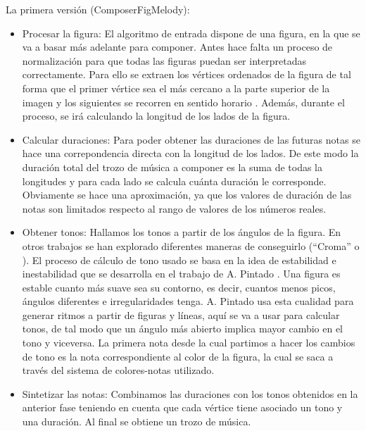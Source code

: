 La primera versión (ComposerFigMelody):
\begin{itemize}
	\item Procesar la figura: El algoritmo de entrada dispone de una figura, en la que se va a basar más adelante para componer. Antes hace falta un proceso de normalización para que todas las figuras puedan ser interpretadas correctamente. \color{blue} Para ello se extraen los vértices ordenados de la figura de tal forma que el primer vértice sea el más cercano a la parte superior de la imagen y los siguientes se recorren en sentido horario \color{black}. Además, durante el proceso, se irá calculando la longitud de los lados de la figura.

	\item Calcular duraciones: Para poder obtener las duraciones de las futuras notas se hace una correpondencia directa con la longitud de los lados. De este modo la duración total del trozo de música a componer es la suma de todas la longitudes y para cada lado se calcula cuánta duración le corresponde. Obviamente se hace una aproximación, ya que los valores de duración de las notas son limitados respecto al rango de valores de los números reales.

	\item Obtener tonos: Hallamos los tonos a partir de los ángulos de la figura. En otros trabajos se han explorado diferentes maneras de conseguirlo (``Croma''\cite{bricksConvertsMusic} o \cite{ImageBaseComposition}). El proceso de cálculo de tono usado se basa en la idea de estabilidad e inestabilidad que se desarrolla en el trabajo de A. Pintado \cite{portutesis}. Una figura es estable cuanto más suave sea su contorno, es decir, cuantos menos picos, ángulos diferentes e irregularidades tenga. A. Pintado usa esta cualidad para generar ritmos a partir de figuras y líneas, aquí se va a usar para calcular tonos, de tal modo que un ángulo más abierto implica mayor cambio en el tono y viceversa. La primera nota desde la cual partimos a hacer los cambios de tono es la nota correspondiente al color de la figura, la cual se saca a través del sistema de colores-notas utilizado.

	\item Sintetizar las notas: Combinamos las duraciones con los tonos obtenidos en la anterior fase teniendo en cuenta que cada vértice tiene asociado un tono y una duración. Al final se obtiene un trozo de música.

\end{itemize}

